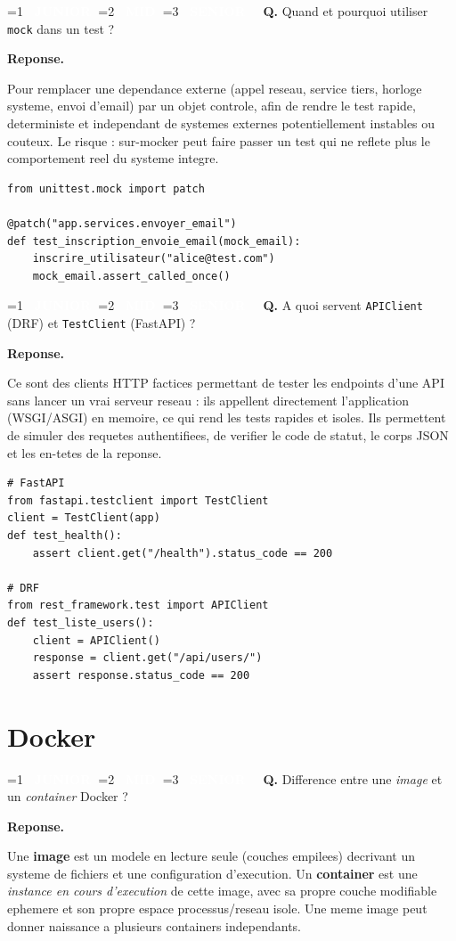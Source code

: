\documentclass[11pt,a4paper]{article}
\newcommand{\badgeJ}{\textcolor{white}{\colorbox{junior}{\small\bfseries\ JUNIOR\ }}}
\newcommand{\badgeM}{\textcolor{white}{\colorbox{mid}{\small\bfseries\ MID\ }}}
\newcommand{\badgeS}{\textcolor{white}{\colorbox{senior}{\small\bfseries\ SENIOR\ }}}
\newcounter{qcount}
\newenvironment{qa}[2]{%
  \stepcounter{qcount}%
  \par\vspace{6pt}%
  \noindent\colorbox{qbg}{\parbox{\dimexpr\linewidth-12pt}{\vspace{2pt}%
  \ifnum#1=1 \badgeJ\fi\ifnum#1=2 \badgeM\fi\ifnum#1=3 \badgeS\fi
  \ \textbf{Q\theqcount.} #2\vspace{2pt}}}\par\vspace{4pt}%
  \noindent\textbf{\color{accent}Reponse.}\ \ignorespaces
}{%
  \par\vspace{8pt}%
}
\begin{document}
\begin{qa}{2}{Quand et pourquoi utiliser \texttt{mock} dans un test ?}
Pour remplacer une dependance externe (appel reseau, service tiers, horloge
systeme, envoi d'email) par un objet controle, afin de rendre le test rapide,
deterministe et independant de systemes externes potentiellement instables
ou couteux. Le risque : sur-mocker peut faire passer un test qui ne reflete
plus le comportement reel du systeme integre.
\begin{lstlisting}
from unittest.mock import patch

@patch("app.services.envoyer_email")
def test_inscription_envoie_email(mock_email):
    inscrire_utilisateur("alice@test.com")
    mock_email.assert_called_once()
\end{lstlisting}
\end{qa}

\begin{qa}{1}{A quoi servent \texttt{APIClient} (DRF) et \texttt{TestClient} (FastAPI) ?}
Ce sont des clients HTTP factices permettant de tester les endpoints d'une
API sans lancer un vrai serveur reseau : ils appellent directement
l'application (WSGI/ASGI) en memoire, ce qui rend les tests rapides et
isoles. Ils permettent de simuler des requetes authentifiees, de verifier le
code de statut, le corps JSON et les en-tetes de la reponse.
\begin{lstlisting}
# FastAPI
from fastapi.testclient import TestClient
client = TestClient(app)
def test_health():
    assert client.get("/health").status_code == 200

# DRF
from rest_framework.test import APIClient
def test_liste_users():
    client = APIClient()
    response = client.get("/api/users/")
    assert response.status_code == 200
\end{lstlisting}
\end{qa}

\newpage
\section{Docker}

\begin{qa}{1}{Difference entre une \emph{image} et un \emph{container} Docker ?}
Une \textbf{image} est un modele en lecture seule (couches empilees) decrivant
un systeme de fichiers et une configuration d'execution. Un \textbf{container}
est une \emph{instance en cours d'execution} de cette image, avec sa propre
couche modifiable ephemere et son propre espace processus/reseau isole. Une
meme image peut donner naissance a plusieurs containers independants.
\end{qa}
\end{document}
